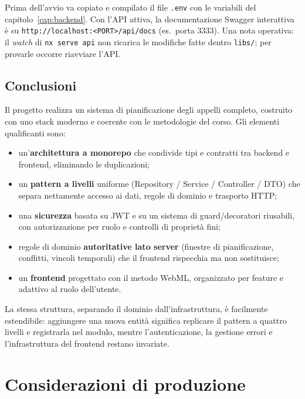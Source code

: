 \documentclass[11pt,a4paper,oneside]{report}
\newcommand{\code}[1]{\texttt{\small #1}}
\newcommand{\file}[1]{\texttt{\small #1}}
\begin{document}
Prima dell'avvio va copiato e compilato il file \file{.env} con le variabili del
capitolo~\ref{cap:backend}. Con l'API attiva, la documentazione Swagger
interattiva è su \code{http://localhost:<PORT>/api/docs} (es.\ porta 3333).
Una nota operativa: il \emph{watch} di \code{nx serve api} non ricarica le
modifiche fatte dentro \file{libs/}; per provarle occorre riavviare l'API.

\section{Conclusioni}
Il progetto realizza un sistema di pianificazione degli appelli completo,
costruito con uno stack moderno e coerente con le metodologie del corso. Gli
elementi qualificanti sono:

\begin{itemize}[leftmargin=1.4em]
  \item un'\textbf{architettura a monorepo} che condivide tipi e contratti tra
        backend e frontend, eliminando le duplicazioni;
  \item un \textbf{pattern a livelli} uniforme (Repository / Service / Controller
        / DTO) che separa nettamente accesso ai dati, regole di dominio e
        trasporto HTTP;
  \item una \textbf{sicurezza} basata su JWT e su un sistema di guard/decoratori
        riusabili, con autorizzazione per ruolo e controlli di proprietà fini;
  \item regole di dominio \textbf{autoritative lato server} (finestre di
        pianificazione, conflitti, vincoli temporali) che il frontend rispecchia
        ma non sostituisce;
  \item un \textbf{frontend} progettato con il metodo WebML, organizzato per
        feature e adattivo al ruolo dell'utente.
\end{itemize}

La stessa struttura, separando il dominio dall'infrastruttura, è facilmente
estendibile: aggiungere una nuova entità significa replicare il pattern a quattro
livelli e registrarla nel modulo, mentre l'autenticazione, la gestione errori e
l'infrastruttura del frontend restano invariate.

\appendix
\chapter{Considerazioni di produzione}
\label{app:produzione}
\end{document}
